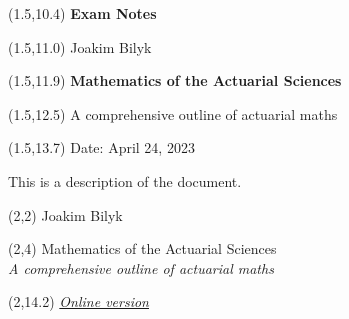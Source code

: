\documentclass[a4paper,12pt,openany]{book}
\begin{document}
\thispagestyle{empty}

\begin{textblock}{12}(1.5,10.4) \noindent\fontsize{20}{20}\selectfont \textbf{Exam Notes}
\end{textblock}

\begin{textblock}{12}(1.5,11.0) \noindent\fontsize{14}{14}\selectfont Joakim Bilyk
\end{textblock}

\begin{textblock}{12}(1.5,11.9)
\noindent\fontsize{20}{20}\selectfont \textbf{Mathematics of the Actuarial Sciences}
\end{textblock}

\begin{textblock}{12}(1.5,12.5)
    \noindent\fontsize{14}{14}\selectfont A comprehensive outline of actuarial maths
\end{textblock}

\begin{textblock}{12}(1.5,13.7)
\noindent\fontsize{11}{11}\selectfont Date: April 24, 2023
\end{textblock}

\hspace{1pt}
\newpage

\onehalfspacing
\thispagestyle{empty}
\noindent

This is a description of the document.

\newpage

\thispagestyle{empty}

\begin{textblock}{12}(2,2)
\noindent\fontsize{20}{20}\selectfont Joakim Bilyk
\end{textblock}

\begin{textblock}{12}(2,4)
\noindent\fontsize{35pt}{40pt}\selectfont Mathematics of the Actuarial Sciences\\
\fontsize{20pt}{40pt}\selectfont \emph{A comprehensive outline of actuarial maths}
\end{textblock}

\begin{textblock}{12}(2,14.2)
\noindent\fontsize{16}{11}\selectfont \emph{\href{https://joakim-bilyk.github.io/books/exam}{Online version}}
\end{textblock}
\end{document}
